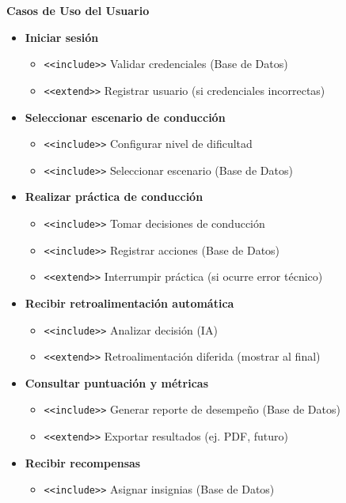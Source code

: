 \documentclass[12pt]{article}
\begin{document}
\noindent
\textbf{Casos de Uso del Usuario}
\begin{itemize}
    \item \textbf{Iniciar sesión}
    \begin{itemize}
        \item \texttt{<<include>>} Validar credenciales (Base de Datos)
        \item \texttt{<<extend>>} Registrar usuario (si credenciales incorrectas)
    \end{itemize}

    \item \textbf{Seleccionar escenario de conducción}
    \begin{itemize}
        \item \texttt{<<include>>} Configurar nivel de dificultad
        \item \texttt{<<include>>} Seleccionar escenario (Base de Datos)
    \end{itemize}

    \item \textbf{Realizar práctica de conducción}
    \begin{itemize}
        \item \texttt{<<include>>} Tomar decisiones de conducción
        \item \texttt{<<include>>} Registrar acciones (Base de Datos)
        \item \texttt{<<extend>>} Interrumpir práctica (si ocurre error técnico)
    \end{itemize}

    \item \textbf{Recibir retroalimentación automática}
    \begin{itemize}
        \item \texttt{<<include>>} Analizar decisión (IA)
        \item \texttt{<<extend>>} Retroalimentación diferida (mostrar al final)
    \end{itemize}

    \item \textbf{Consultar puntuación y métricas}
    \begin{itemize}
        \item \texttt{<<include>>} Generar reporte de desempeño (Base de Datos)
        \item \texttt{<<extend>>} Exportar resultados (ej. PDF, futuro)
    \end{itemize}

    \item \textbf{Recibir recompensas}
    \begin{itemize}
        \item \texttt{<<include>>} Asignar insignias (Base de Datos)
    \end{itemize}
\end{itemize}
\end{document}
